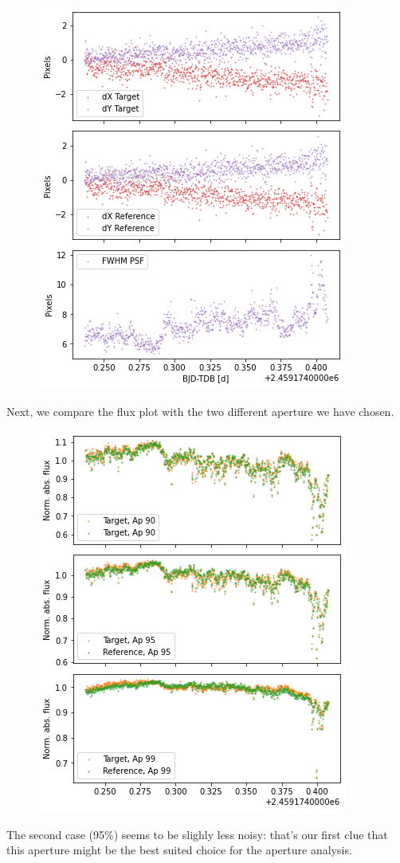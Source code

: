 \documentclass[a4paper,11pt,twocolumn]{article}
\begin{document}
\begin{figure}[H]
    \centering  
    \includegraphics[scale=0.45, angle=0]{../pictures/taste/target-ref_position.png}
\end{figure}
Next, we compare the flux plot with the two different aperture we have chosen.
\begin{figure}[H]
    \centering  
    \includegraphics[scale=0.45, angle=0]{../pictures/taste/apertures.png}
\end{figure}
The second case (95\%) seems to be slighly less noisy: that's our first clue 
that this aperture might be the best suited choice for the aperture analysis.
\end{document}

